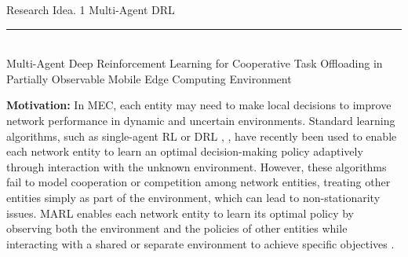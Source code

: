 \documentclass[12pt]{article}
\begin{document}
\begin{center} 
	
	
	\vspace{-17mm}
	
	\large Research Idea. 1  \hfill Multi-Agent DRL \vspace{1mm} \hrule
	
	\vspace{-1mm}
	
	\textcolor{white}{i} \\ \LARGE Multi-Agent Deep Reinforcement Learning for Cooperative Task Offloading in Partially Observable Mobile Edge Computing Environment \vspace{6mm}\\ 
	
\end{center} \small
\vspace{-5mm}

\noindent\textbf{\large Motivation:  }
\noindent
In MEC, each entity may need to make local decisions to improve network performance in dynamic and uncertain environments. Standard learning algorithms, such as single-agent RL or DRL \cite{liao2023online}, \cite{huang2019deep}, have recently been used to enable each network entity to learn an optimal decision-making policy adaptively through interaction with the unknown environment. However, these algorithms fail to model cooperation or competition among network entities, treating other entities simply as part of the environment, which can lead to non-stationarity issues. MARL enables each network entity to learn its optimal policy by observing both the environment and the policies of other entities while interacting with a shared or separate environment to achieve specific objectives \cite{zhang2021multi}.



\end{document}
